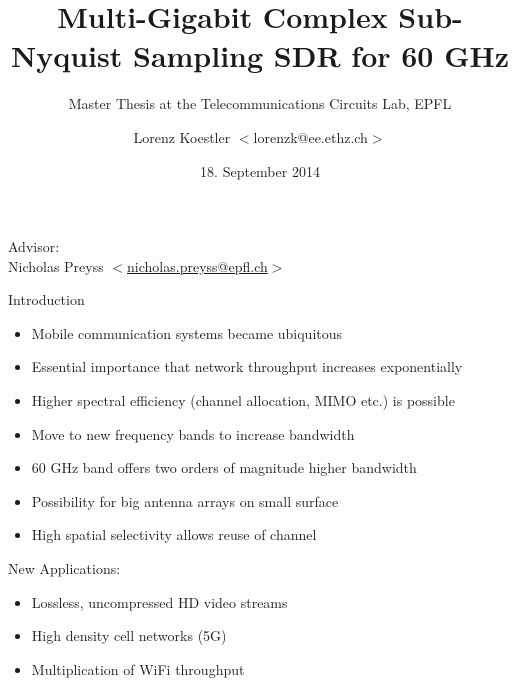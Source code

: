 \documentclass[10pt]{beamer}
\title{Multi-Gigabit Complex Sub-Nyquist Sampling SDR for 60 GHz}
\subtitle{Master Thesis at the Telecommunications Circuits Lab, EPFL}
\author{Lorenz Koestler $ < $lorenzk@ee.ethz.ch$ > $}
\date[18.9.2014]{18. September 2014}
\begin{document}
{
  \begin{frame}
    \titlepage

    {\color{white}
      Advisor: \\
      Nicholas Preyss $ < $\href{mailto:nicholas.preyss@epfl.ch}{nicholas.preyss@epfl.ch}$ > $ \\
    }
  \end{frame}
}

\begin{frame}{Introduction}
  \begin{itemize}
  \item Mobile communication systems became ubiquitous
  \item Essential importance that network throughput increases
    exponentially
  \item Higher spectral efficiency (channel allocation, MIMO etc.) is possible
  \item Move to new frequency bands to increase bandwidth
  \item 60 GHz band offers two orders of magnitude higher bandwidth
  \item Possibility for big antenna arrays on small surface
  \item High spatial selectivity allows reuse of channel
  \end{itemize}
  \begin{block}{New Applications:}
    \begin{itemize}
    \item Lossless, uncompressed HD video streams
    \item High density cell networks (5G)
    \item Multiplication of WiFi throughput
    \end{itemize}
  \end{block}
\end{frame}
\end{document}
